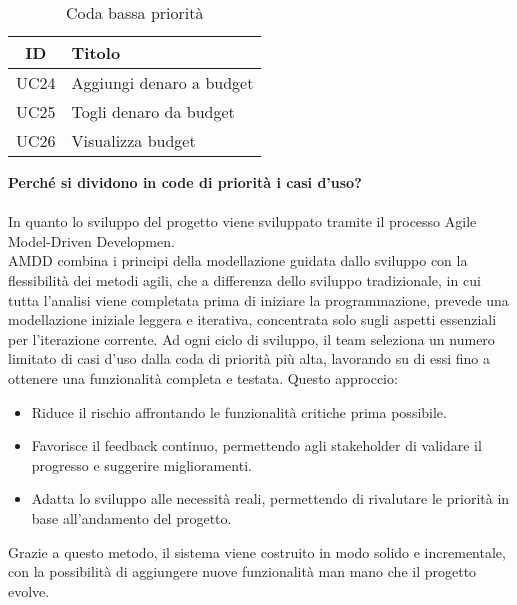     \begin{table}[H]
        \centering
        \begin{tabular}{|c|l|}
        \hline
        \textbf{ID} & \textbf{Titolo} \\ \hline
        UC24 & Aggiungi denaro a budget \\ \hline
        UC25 & Togli denaro da budget \\ \hline
        UC26 & Visualizza budget \\ \hline
        \end{tabular}
        \caption{Coda bassa priorità}
    \end{table}
\textbf{Perché si dividono in code di priorità i casi d'uso?}
\\
\\
In quanto lo sviluppo del progetto viene sviluppato tramite il processo Agile Model-Driven Developmen.
\\
AMDD combina i principi della modellazione guidata dallo sviluppo con la flessibilità dei metodi agili, che a differenza dello sviluppo tradizionale, in cui tutta l’analisi viene completata prima di iniziare la programmazione, prevede una modellazione iniziale leggera e iterativa, concentrata solo sugli aspetti essenziali per l’iterazione corrente.
\newline
Ad ogni ciclo di sviluppo, il team seleziona un numero limitato di casi d’uso dalla coda di priorità più alta, lavorando su di essi fino a ottenere una funzionalità completa e testata. Questo approccio:
\begin{itemize}
    \item Riduce il rischio affrontando le funzionalità critiche prima possibile.
    \item Favorisce il feedback continuo, permettendo agli stakeholder di validare il progresso e suggerire miglioramenti.
    \item Adatta lo sviluppo alle necessità reali, permettendo di rivalutare le priorità in base all’andamento del progetto.
\end{itemize}
Grazie a questo metodo, il sistema viene costruito in modo solido e incrementale, con la possibilità di aggiungere nuove funzionalità man mano che il progetto evolve.